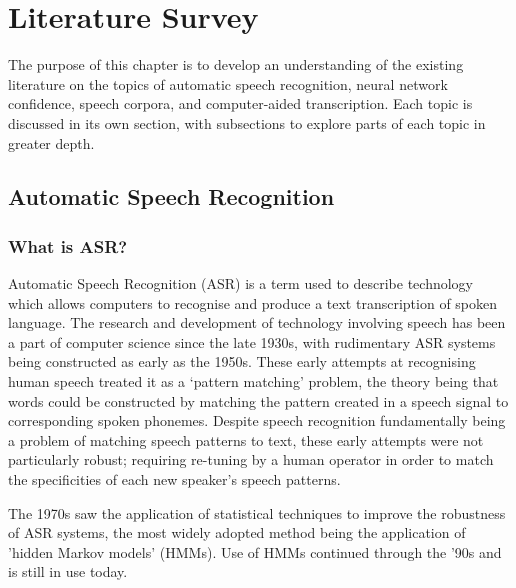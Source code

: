 \chapter{Literature Survey}\label{ch:literature-survey}
The purpose of this chapter is to develop an understanding of the existing literature on the topics of automatic speech recognition, neural network confidence, speech corpora, and computer-aided transcription.
Each topic is discussed in its own section, with subsections to explore parts of each topic in greater depth.

\section{Automatic Speech Recognition}\label{sec:what-is-asr}

\subsection{What is ASR?}

Automatic Speech Recognition (ASR) is a term used to describe technology which allows computers to recognise and produce a text transcription of spoken language.
The research and development of technology involving speech has been a part of computer science since the late 1930s\cite{Rabiner2004Jan,vocoder}, with rudimentary ASR systems being constructed as early as the 1950s\cite{asr-52}.
These early attempts at recognising human speech treated it as a `pattern matching' problem, the theory being that words could be constructed by matching the pattern created in a speech signal to corresponding spoken phonemes\cite{Rabiner2004Jan}.
Despite speech recognition fundamentally being a problem of matching speech patterns to text, these early attempts were not particularly robust; requiring re-tuning by a human operator in order to match the specificities of each new speaker's speech patterns\cite{asr-52}.

The 1970s saw the application of statistical techniques to improve the robustness of ASR systems\cite{Rabiner2004Jan}, the most widely adopted method being the application of 'hidden Markov models' (HMMs)\cite{baker1975stochastic}.
Use of HMMs continued through the '90s\cite{bengio1999markovian} and is still in use today\cite{hmm2023}.

